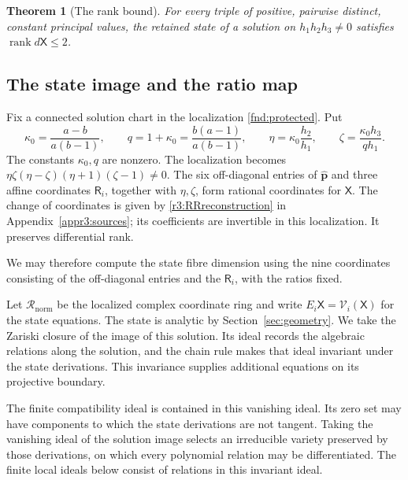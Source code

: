 \documentclass[11pt,a4paper]{article}
\numberwithin{equation}{section}
\theoremstyle{plain}
\newtheorem{theorem}{Theorem}[section]
\theoremstyle{definition}
\theoremstyle{remark}
\begin{document}
\begin{theorem}[The rank bound]\label{r3:theorem}
For every triple of positive, pairwise distinct, constant principal values,
the retained state of a solution on $h_1h_2h_3\ne0$ satisfies
$\operatorname{rank}d\mathsf X\le2$.
\end{theorem}

\subsection{The state image and the ratio map}\label{r3:algebra}
Fix a connected solution chart in the localization
\eqref{fnd:protected}. Put
\begin{equation}\label{r3:ratios}
 \kappa_0=\frac{a-b}{a(b-1)},\qquad
 q=1+\kappa_0=\frac{b(a-1)}{a(b-1)},\qquad
 \eta=\kappa_0\frac{h_2}{h_1},\qquad
 \zeta=\frac{\kappa_0h_3}{qh_1}.
\end{equation}
The constants $\kappa_0,q$ are nonzero. The localization becomes
$\eta\zeta(\eta-\zeta)(\eta+1)(\zeta-1)\ne0$.
The six off-diagonal entries of $\widehat{\boldsymbol p}$ and three
affine coordinates $\mathsf R_i$, together with $\eta,\zeta$, form
rational coordinates for $\mathsf X$. The change of coordinates is
given by \eqref{r3:RRreconstruction} in
Appendix~\ref{appr3:sources}; its coefficients are invertible in this
localization. It preserves differential rank.

We may therefore compute the state fibre dimension using the
nine coordinates consisting of the off-diagonal entries and the
$\mathsf R_i$, with the ratios fixed.

Let $\mathscr R_{\mathrm{norm}}$ be the localized complex coordinate
ring and write $E_i\mathsf X=\mathcal V_i(\mathsf X)$ for the state
equations. The state is analytic by Section~\ref{sec:geometry}.
We take the Zariski closure of the image of this solution. Its ideal
records the algebraic relations along the solution, and the chain
rule makes that ideal invariant under the state derivations. This
invariance supplies additional equations on its projective boundary.

The finite compatibility ideal is contained in this vanishing
ideal. Its zero set may have components to which the state
derivations are not tangent. Taking the vanishing ideal of the
solution image selects an irreducible variety preserved by those
derivations, on which every polynomial relation may be
differentiated. The finite local ideals below consist of relations
in this invariant ideal.
\end{document}
